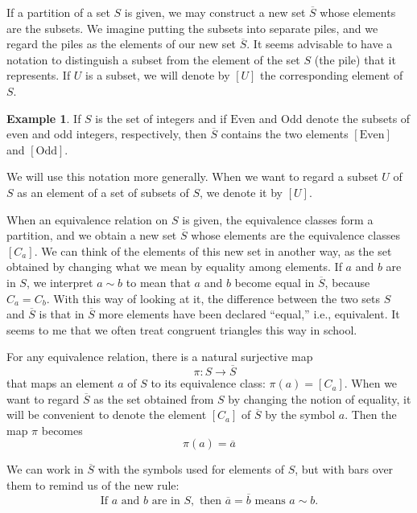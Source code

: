 \documentclass[
]{book}
\theoremstyle{definition}
\theoremstyle{definition}
\newtheorem{example}{Example}[chapter]
\theoremstyle{definition}
\theoremstyle{definition}
\theoremstyle{remark}
\begin{document}
If a partition of a set \(S\) is given, we may construct a new set \(\overline{S}\) whose elements are the subsets. We imagine putting the subsets into separate piles, and we regard the piles as the elements of our new set \(\overline{S}\). It seems advisable to have a notation to distinguish a subset from the element of the set \(S\) (the pile) that it represents. If \(U\) is a subset, we will denote by \([U]\) the corresponding element of \(S\).

\begin{example}
\protect\hypertarget{exm:unnamed-chunk-30}{}\label{exm:unnamed-chunk-30}If \(S\) is the set of integers and if \(\text{Even}\) and \(\text{Odd}\) denote the subsets of even and odd integers, respectively, then \(\overline{S}\) contains the two elements \([\text{Even}]\) and \([\text{Odd}]\).
\end{example}

We will use this notation more generally. When we want to regard a subset \(U\) of \(S\) as an element of a set of subsets of \(S\), we denote it by \([U]\).

When an equivalence relation on \(S\) is given, the equivalence classes form a partition, and we obtain a new set \(\overline{S}\) whose elements are the equivalence classes \([C_a]\). We can think of the elements of this new set in another way, as the set obtained by changing what we mean by equality among elements. If \(a\) and \(b\) are in \(S\), we interpret \(a \sim b\) to mean that \(a\) and \(b\) become equal in \(\overline{S}\), because \(C_a = C_b\). With this way of looking at it, the difference between the two sets \(S\) and \(\overline{S}\) is that in \(\overline{S}\) more elements have been declared ``equal,'' i.e., equivalent. It seems to me that we often treat congruent triangles this way in school.

For any equivalence relation, there is a natural surjective map
\begin{equation}
 \quad \pi : S \to \overline{S}
\end{equation}
that maps an element \(a\) of \(S\) to its equivalence class: \(\pi(a) = [C_a]\). When we want to regard \(\overline{S}\) as the set obtained from \(S\) by changing the notion of equality, it will be convenient to denote the element \([C_a]\) of \(\overline{S}\) by the symbol \(a\). Then the map \(\pi\) becomes
\begin{equation}
\pi(a) = \overline{a}
\end{equation}

We can work in \(\overline{S}\) with the symbols used for elements of \(S\), but with bars over them to remind us of the new rule:
\begin{equation}
\text{If } a \text{ and } b \text{ are in } S, \text{ then } \overline{a} = \overline{b} \text{ means } a \sim b.
\end{equation}
\end{document}
